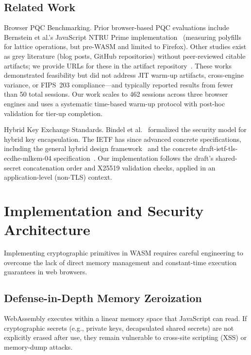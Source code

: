 \documentclass[11pt,a4paper]{article}
\def\textbf#1{#1}%
\def\texttt#1{#1}%
\begin{document}
\subsection{Related Work}
\label{subsec:related-work}

\textbf{Browser PQC Benchmarking.} Prior browser-based PQC evaluations include Bernstein et al.'s JavaScript NTRU Prime implementation~\cite{bernstein2018ntrprime} (measuring polyfills for lattice operations, but pre-WASM and limited to Firefox). Other studies exist as grey literature (blog posts, GitHub repositories) without peer-reviewed citable artifacts; we provide URLs for these in the artifact repository~\cite{starrycrypt-artifact}. These works demonstrated feasibility but did not address JIT warm-up artifacts, cross-engine variance, or FIPS~203 compliance---and typically reported results from fewer than 50 total sessions. Our work scales to 462 sessions across three browser engines and uses a systematic time-based warm-up protocol with post-hoc validation for tier-up completion.

\textbf{Hybrid Key Exchange Standards.} Bindel et al.~\cite{bindel2019hybrid} formalized the security model for hybrid key encapsulation. The IETF has since advanced concrete specifications, including the general hybrid design framework~\cite{stebila2026hybrid} and the concrete \texttt{draft-ietf-tls-ecdhe-mlkem-04} specification~\cite{stebila2026ecdheMlkem}. Our implementation follows the draft's shared-secret concatenation order and X25519 validation checks, applied in an application-level (non-TLS) context.

\section{Implementation and Security Architecture}
\label{sec:implementation}

Implementing cryptographic primitives in WASM requires careful engineering to overcome the lack of direct memory management and constant-time execution guarantees in web browsers.

\subsection{Defense-in-Depth Memory Zeroization}
\label{subsec:zeroization}

WebAssembly executes within a linear memory space that JavaScript can read. If cryptographic secrets (e.g., private keys, decapsulated shared secrets) are not explicitly erased after use, they remain vulnerable to cross-site scripting (XSS) or memory-dump attacks.
\end{document}
